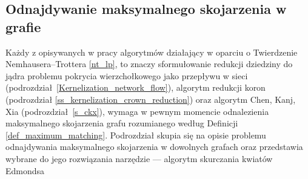 \subsection{Odnajdywanie maksymalnego skojarzenia w grafie}\label{ss_edmonds}
\par{
  Każdy z opisywanych w pracy algorytmów działający w oparciu o Twierdzenie\\Nemhausera--Trottera \ref{nt_lp}, to znaczy sformułowanie redukcji dziedziny do jądra problemu pokrycia wierzchołkowego jako przepływu w sieci (podrozdział \ref{Kernelization_network_flow}), algorytm redukcji koron (podrozdział \ref{ss_kernelization_crown_reduction}) oraz algorytm Chen, Kanj, Xia (podrozdział~\ref{s_ckx}), wymaga w pewnym momencie odnalezienia maksymalnego skojarzenia grafu rozumianego według Definicji \ref{def_maximum_matching}.
  Podrozdział skupia się na opisie problemu odnajdywania maksymalnego skojarzenia w dowolnych grafach oraz przedstawia wybrane do jego rozwiązania narzędzie --- algorytm skurczania kwiatów Edmondsa
}

